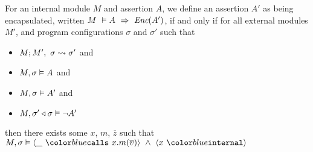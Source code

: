 \begin{definition}
\label{def:encapsulation}
For an internal module $M$ and assertion $A$, we define an assertion $A'$ as being 
encapsulated, written $M\ \vDash A\ \Rightarrow\ \encaps{A'}$, if and only if
for all external modules $M'$, and program configurations $\sigma$ and $\sigma'$
such that 
\begin{itemize}
\item
$M ; M',\ \sigma \leadsto \sigma'$ and 
\item
$M , \sigma \vDash A$ and
\item
$M , \sigma \vDash A'$ and
\item
$M , \sigma' \triangleleft \sigma \vDash \neg A'$
\end{itemize}
then there exists some $x$, $m$, $\overline{z}$ such that
$\satisfiesA{M}{\sigma}{\calls{\_}{x}{m}{\overline{v}}\ \wedge\ \internal{x}}$
\end{definition}